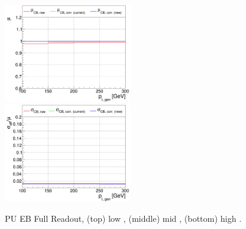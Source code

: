 \begin{figure}
\includegraphics[width=0.495\textwidth]{./plots_pdf/ECAL_plots/plotsPU/EB/FULL/pdf/GENPT/EBFULL_GENPT_0100_0300_MuOverBins.pdf}
\includegraphics[width=0.495\textwidth]{./plots_pdf/ECAL_plots/plotsPU/EB/FULL/pdf/GENPT/EBFULL_GENPT_0100_0300_EffSigmaOverBins.pdf}

\caption{PU EB Full Readout, (top) low \pt, (middle) mid \pt, (bottom) high \pt.}
\label{fig:PU_EBFULL_pt}
\end{figure}


